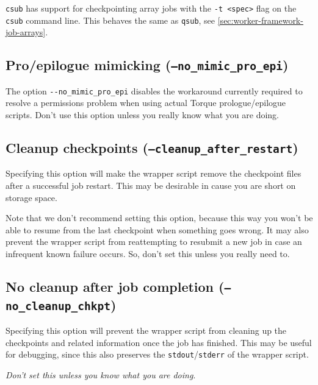 \lstinline|csub| has support for checkpointing array jobs with the \lstinline|-t <spec>|
flag on the \lstinline|csub| command line. This behaves the same as \lstinline|qsub|, see \autoref{sec:worker-framework-job-arrays}.


\subsection{Pro/epilogue mimicking (\texttt{--no\_mimic\_pro\_epi})}

The option \lstinline|--no_mimic_pro_epi| disables the workaround currently required to resolve
a permissions problem when using actual Torque prologue/epilogue scripts. Don't use
this option unless you really know what you are doing.

\subsection{Cleanup checkpoints (\texttt{--cleanup\_after\_restart})}

Specifying this option will make the wrapper script remove the checkpoint files after
a successful job restart. This may be desirable in cause you are short on storage space.

Note that we don't recommend setting this option, because this way you won't be able
to resume from the last checkpoint when something goes wrong. It may also prevent
the wrapper script from reattempting to resubmit a new job in case an infrequent known
failure occurs. So, don't set this unless you really need to.

\subsection{No cleanup after job completion (\texttt{--no\_cleanup\_chkpt})}

Specifying this option will prevent the wrapper script from cleaning up the
checkpoints and related information once the job has finished. This may be useful
for debugging, since this also preserves the \lstinline|stdout|/\lstinline|stderr|
of the wrapper script.

\emph{Don't set this unless you know what you are doing}.
